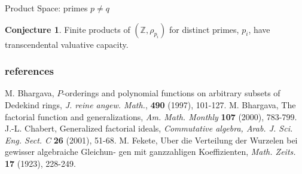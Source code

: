 \documentclass{beamer}
\theoremstyle{definition}
\newtheorem{conjecture}{Conjecture}
\begin{document}
\begin{frame}{Product Space: primes $p \neq q$}
\begin{conjecture} Finite products of $(\mathbb{Z}, \rho_{p_i})$ for distinct primes, $p_i$, have transcendental valuative capacity.\\ \end{conjecture}
\end{frame}


\begin{frame}
\frametitle{references}
\begin{thebibliography}{9}
	 M. Bhargava, $P$-orderings and polynomial functions on arbitrary subsets of Dedekind
	rings, \textit{J. reine angew. Math.}, \textbf{490} (1997), 101-127.
	 M. Bhargava, The factorial function and generalizations, \textit{Am. Math. Monthly}
	\textbf{107} (2000), 783-799.
	 J.-L. Chabert, Generalized factorial ideals, \textit{Commutative algebra, Arab. J. Sci. Eng.
		Sect. C} \textbf{26} (2001), 51-68.
	 M. Fekete, Uber die Verteilung der Wurzelen bei gewisser algebraiche Gleichun-
	gen mit ganzzahligen Koeffizienten, \textit{Math. Zeits.} \textbf{17} (1923), 228-249.

\end{thebibliography}
\end{frame}
\end{document}
